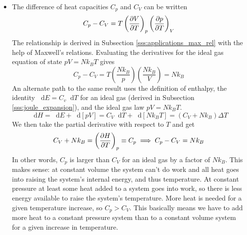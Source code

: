 \documentclass[11pt, a4paper]{article}
\newcommand{\diff}{\mathop{}\!\mathrm{d}} %
\newcommand{\pdveval}[3]{\left(\pdv{#1}{#2}\right)_{#3}}
\begin{document}
\begin{itemize}
	\item The difference of heat capacities $ C_{p} $ and $ C_{V} $ can be written
	\begin{equation*}
		C_{p} - C_{V} = T \pdveval{V}{T}{p}\pdveval{p}{T}{V}
	\end{equation*}
	The relationship is derived in Subsection \ref{sss:applications_max_rel} with the help of Maxwell's relations. Evaluating the derivatives for the ideal gas equation of state $ pV = Nk_{B}T $ gives 
	\begin{equation*}
		C_{p} - C_{V} = T \left(\frac{Nk_{B}}{p}\right) \left(\frac{Nk_{B}}{V}\right) = Nk_{B}
	\end{equation*}
	An alternate path to the same result uses the definition of enthalpy, the identity $ \diff E = C_{v} \diff T $ for an ideal gas (derived in Subsection \ref{sss:joule_expansion}), and the ideal gas law $  pV = Nk_{B}T $. 
	\begin{equation*}
		\diff H = \diff E + \diff [pV] = C_{V} \diff T + \diff [Nk_{B}T] = (C_{V} + Nk_{B}) \Delta T 
	\end{equation*}
	We then take the partial derivative with respect to $ T $ and get
	\begin{equation*}
		C_{V} + Nk_{B}  = \pdveval{H}{T}{p} \equiv C_{p} \implies C_{p} - C_{V} = Nk_{B}
	\end{equation*}
	In other words, $ C_{p} $ is larger than $ C_{V} $ for an ideal gas by a factor of $ Nk_{B} $. This makes sense: at constant volume the system can't do work and all heat goes into raising the system's internal energy, and thus temperature. At constant pressure at least some heat added to a system goes into work, so there is less energy available to raise the system's temperature. More heat is needed for a given temperature increase, so $ C_{p} > C_{V} $. This basically means we have to add more heat to a constant pressure system than to a constant volume system for a given increase in temperature.
		
\end{itemize}
\end{document}
